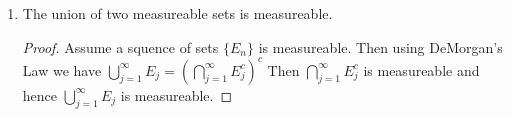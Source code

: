 \documentclass{article}[12 pt]
\begin{document}
\begin{enumerate}
\begin{proof}
		      Hence $m_{*}(E^c\backslash S) \leq m_{*}(E\backslash O_n) < \frac{1}{n}$\\
		      Take $n\to \infty$ to get the result. Therefore $E^c\backslash S$ is measureable.
		      To conclude, note that $E^c = S\cup (E^c\backslash S)$\\
		      Then $E^c$ is measureable.
	      \end{proof}
	\item The union of two measureable sets is measureable.
	      \begin{proof}
		      Assume a squence of sets $\{E_n\}$ is measureable.
		      Then using DeMorgan's Law we have $\bigcup_{j=1}^{\infty}E_j = (\bigcap_{j=1}^{\infty}E_j^c)^c$
		      Then $\bigcap_{j=1}^{\infty}E_j^c$ is measureable and hence $\bigcup_{j=1}^{\infty}E_j$ is measureable.
	      \end{proof}
\end{enumerate}
\end{document}
